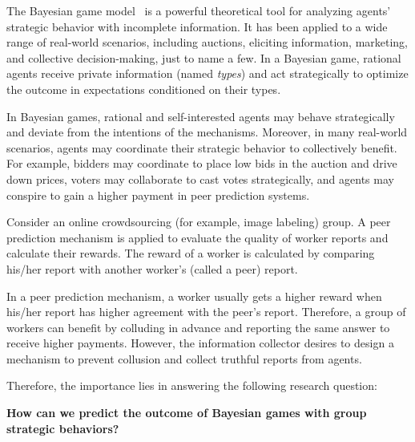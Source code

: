 The Bayesian game model~\citep{Harsanyi67} is a powerful theoretical tool for analyzing agents' strategic behavior with incomplete information. It has been applied to a wide range of real-world scenarios, including auctions, eliciting information, marketing, and collective decision-making, just to name a few. %
In a Bayesian game, rational agents receive private information (named {\em types}) and act strategically to optimize the outcome in expectations conditioned on their types. 

In Bayesian games, rational and self-interested agents may behave strategically and deviate from the intentions of the mechanisms. Moreover, in many real-world scenarios, agents may coordinate their strategic behavior to collectively benefit. For example, bidders may coordinate to place low bids in the auction and drive down prices, voters may collaborate to cast votes strategically, and agents may conspire to gain a higher payment in peer prediction systems. 

\begin{example}
\label{ex:motive}
Consider an online crowdsourcing (for example, image labeling) group. %
A peer prediction mechanism is applied to evaluate the quality of worker reports and calculate their rewards. The reward of a worker is calculated by comparing his/her report with another worker's (called a peer) report. 

In a peer prediction mechanism, a worker usually gets a higher reward when his/her report has higher agreement with the peer's report. Therefore, a group of workers can benefit by colluding in advance and reporting the same answer to receive higher payments.  However, the information collector desires to design a mechanism to prevent collusion and collect truthful reports from agents. %
\end{example}

Therefore, the importance lies in answering the following research question:
\begin{center}
   {\bf How can we predict the outcome of Bayesian games with group strategic behaviors?} 
\end{center}

